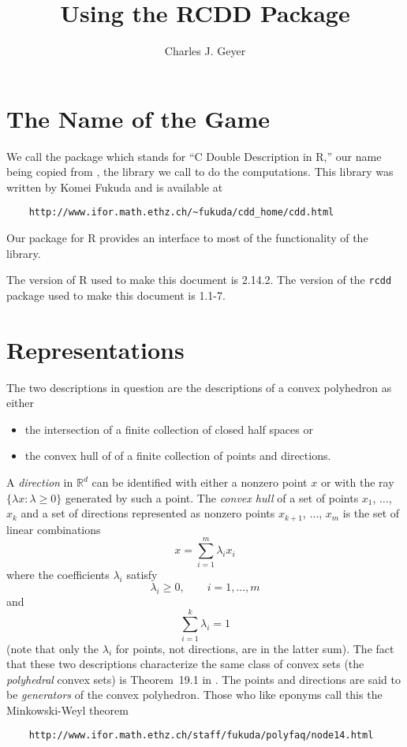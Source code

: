 \documentclass{article}
\newcommand{\real}{\mathbb{R}}
\begin{document}
\title{Using the RCDD Package}
\author{Charles J. Geyer}
\maketitle



\section{The Name of the Game}

We call the package \verb@rcdd@ which stands
for ``C Double Description in R,'' our name being copied from
\verb@cddlib@, the library we call to do the computations.
This library was written by Komei Fukuda and is available at
\begin{verbatim}
    http://www.ifor.math.ethz.ch/~fukuda/cdd_home/cdd.html
\end{verbatim}
Our \verb@rcdd@ package for R provides an interface to most
of the functionality of the \verb@cddlib@ library.

The version of R used to make this document is 2.14.2.  The version
of the \texttt{rcdd} package used to make this document is 1.1-7.

\section{Representations}

The two descriptions in question are the descriptions of a convex polyhedron
as either
\begin{itemize}
\item the intersection of a finite collection of closed half spaces or
\item the convex hull of of a finite collection of points and directions.
\end{itemize}

A \emph{direction} in $\real^d$ can be identified with
either a nonzero point $x$ or with
the ray $\{ \lambda x : \lambda \ge 0 \}$ generated by such a point.  
The \emph{convex hull} of a set of points $x_1$, $\ldots$, $x_k$ and
a set of directions represented as nonzero
points $x_{k + 1}$, $\ldots$, $x_m$ is the set of linear
combinations
$$
   x = \sum_{i = 1}^m \lambda_i x_i
$$
where the coefficients $\lambda_i$ satisfy
$$
   \lambda_i \ge 0, \qquad i = 1, \ldots, m
$$
and
$$
   \sum_{i = 1}^k \lambda_i = 1
$$
(note that only the $\lambda_i$ for points, not directions,
are in the latter sum).
The fact that these two descriptions characterize the same class of
convex sets (the \emph{polyhedral} convex sets) is Theorem~19.1
in \citet{rocky}.
The points and directions are said to be \emph{generators} of the
convex polyhedron.  Those who like eponyms call this the
Minkowski-Weyl theorem
\begin{verbatim}
    http://www.ifor.math.ethz.ch/staff/fukuda/polyfaq/node14.html
\end{verbatim}
\end{document}
